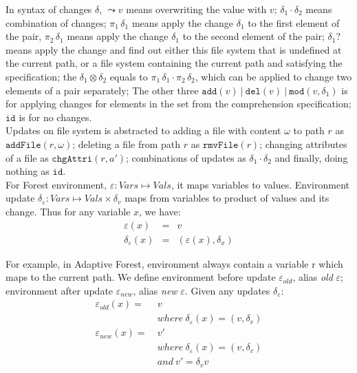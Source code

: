 \documentclass[10pt,twoside,a4paper]{article}
\theoremstyle{theorem}
\theoremstyle{lemma}
\theoremstyle{property}
\theoremstyle{definition}
\theoremstyle{assumption}
\def\fst{\pi_1}
\def\snd{\pi_2}
\begin{document}
In syntax of changes $\delta$, $\leadsto v$ means overwriting the value with $v$; 
$\delta_1 \cdot \delta_2$ means combination of changes; 
$\fst\,\delta_1$ means apply the change $\delta_1$ to the first element of the pair, $\snd\,\delta_1$ means apply the change $\delta_1$ to the second element of the pair; 
$\delta_1?$ means apply the change and find out either this file system that is undefined at the current path, or a file system containing the current path and satisfying the specification; 
the $\delta_1 \otimes \delta_2$ equals to $\fst\,\delta_1 \cdot \snd\,\delta_2$, which can be applied to change two elements of a pair separately; 
The other three $\mathtt{add}(v) ~|~ \mathtt{del}(v) ~|~ \mathtt{mod}(v, \delta_1)$ is for applying changes for elements in the set from the comprehension specification; 
$\mathtt{id}$ is for no changes. \\

Updates on file system is abstracted to adding a file with content $\omega$ to path $r$ as $\mathtt{addFile}(r,\omega)$; deleting a file from path $r$ as $\mathtt{rmvFile}(r)$; changing attributes of a file as $\mathtt{chgAttri}(r,a')$; combinations of updates as $\delta_1 \cdot \delta_2$ and finally, doing nothing as $\mathtt{id}$.\\

For Forest environment, $\varepsilon: V\!ars \mapsto V\!als$, it maps variables to values. Environment update $\delta_\varepsilon: V\!ars \mapsto V\!als \times \delta_v$ maps from variables to product of values and its change. Thus for any variable $x$, we have:
\begin{eqnarray*}
	\varepsilon (x) &=& v\\
	\delta_\varepsilon (x) &=& (\varepsilon(x), \delta_x)
\end{eqnarray*}

For example, in Adaptive Forest, environment always contain a variable r which maps to the current path. We define environment before update $\varepsilon_{old}$, alias \emph{old} $\varepsilon$; environment after update $\varepsilon_{new}$, alias \emph{new} $\varepsilon$. Given any updates $\delta_\varepsilon$:
\begin{align*}
	\varepsilon_{old}(x) =& ~v\\
						  & ~where ~\delta_\varepsilon (x) = (v, \delta_v)\\
	\varepsilon_{new}(x) =& ~v'\\
						  & ~where ~\delta_\varepsilon (x) = (v, \delta_v)\\
						  & ~and ~v' = \delta_v v
\end{align*}
\end{document}
